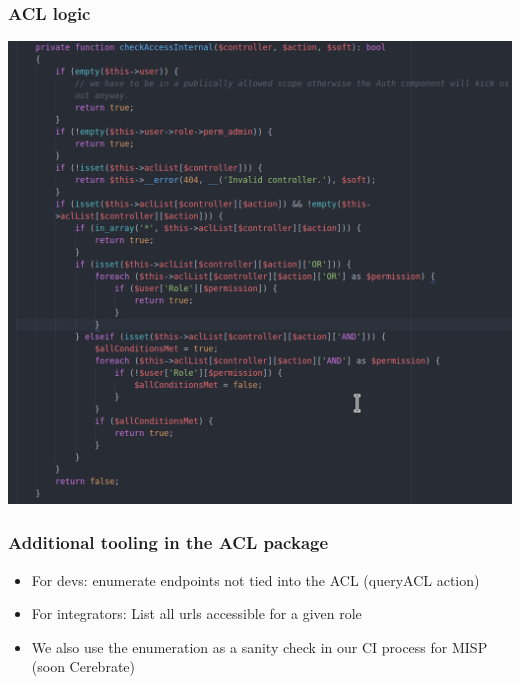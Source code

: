 \begin{frame}
  \frametitle{ACL logic}
  \begin{center}
    \includegraphics[scale=0.3]{ACLCheck.png}
  \end{center}
\end{frame}

\begin{frame}
  \frametitle{Additional tooling in the ACL package}
  \begin{itemize}
    \item For devs: enumerate endpoints not tied into the ACL (queryACL action)
    \item For integrators: List all urls accessible for a given role
    \item We also use the enumeration as a sanity check in our CI process for MISP (soon Cerebrate)
  \end{itemize}
\end{frame}

